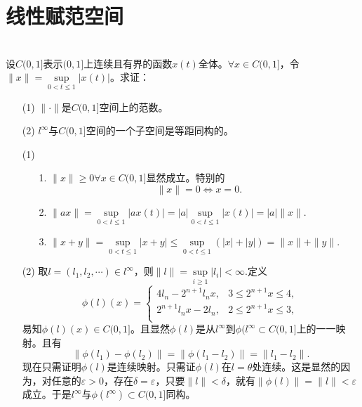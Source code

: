 \section{线性赋范空间}
\begin{exercise}
\hfill\\
设$C(0,1]$表示$(0,1]$上连续且有界的函数$x(t)$全体。$\forall x\in C(0,1]$，令$\|x\|=\sup\limits_{0<t\leq1}|x(t)|$。求证：
\begin{enumerate}
\item[(1)] $\|\cdot\|$是$C(0,1]$空间上的范数。
\item[(2)] $l^{\infty}$与$C(0,1]$空间的一个子空间是等距同构的。
\end{enumerate}

\begin{enumerate}
\item[(1)]
\begin{enumerate}
\item[1.]$\|x\|\geq0\forall x\in C(0,1]$显然成立。特别的
$$\|x\|=0\Leftrightarrow x=0.$$
\item[2.]$\|ax\|=\sup\limits_{0<t\leq1}|ax(t)|=|a|\sup\limits_{0<t\leq1}|x(t)|=|a|\|x\|.$
\item[3.]$\|x+y\|=\sup\limits_{0<t\leq1}|x+y|\leq\sup\limits_{0<t\leq1}(|x|+|y|)=\|x\|+\|y\|.$
\end{enumerate}
\item[(2)] 取$l=(l_1,l_2,\cdots)\in l^{\infty}$，则$\|l\|=\sup\limits_{i\geq1}|l_i|<\infty.$定义$$\phi(l)(x)=\begin{cases}
4l_n-2^{n+1}l_nx,&3\leq2^{n+1}x\leq4,\\
2^{n+1}l_nx-2l_n,&2\leq2^{n+1}x\leq3,\\
\end{cases}$$
易知$\phi(l)(x)\in C(0,1]$。且显然$\phi(l)$是从$l^{\infty}$到$\phi(l^{\infty}\subset C(0,1]$上的一一映射。且有$$\|\phi(l_1)-\phi(l_2)\|=\|\phi(l_1-l_2)\|=\|l_1-l_2\|.$$
现在只需证明$\phi(l)$是连续映射。只需证$\phi(l)$在$l=\theta$处连续。这是显然的因为，对任意的$\varepsilon>0$，存在$\delta=\varepsilon$，只要$\|l\|<\delta$，就有$\|\phi(l)\|=\|l\|<\varepsilon$成立。于是$l^{\infty}$与$\phi(l^{\infty})\subset C(0,1]$同构。
\end{enumerate}
\end{exercise}

